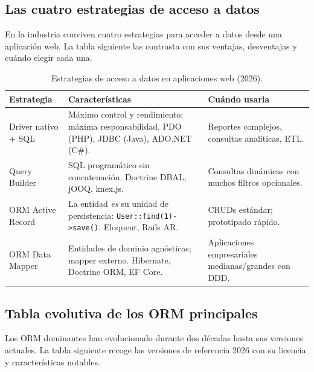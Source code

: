 \subsection{Las cuatro estrategias de acceso a datos}

En la industria conviven cuatro estrategias para acceder a
datos desde una aplicación web. La tabla siguiente las contrasta
con sus ventajas, desventajas y cuándo elegir cada una.


\begin{table}[htbp]
\centering
\caption{Estrategias de acceso a datos en aplicaciones web (2026).}
\footnotesize
\begin{tabularx}{\textwidth}{lXX}
\toprule
\textbf{Estrategia} & \textbf{Características} & \textbf{Cuándo usarla}\\
\midrule
Driver nativo + SQL & Máximo control y rendimiento; máxima responsabilidad. PDO (PHP), JDBC (Java), ADO.NET (C\#). & Reportes complejos, consultas analíticas, ETL.\\
Query Builder & SQL programático sin concatenación. Doctrine DBAL, jOOQ, knex.js. & Consultas dinámicas con muchos filtros opcionales.\\
ORM Active Record & La entidad \emph{es} su unidad de persistencia: \texttt{User::find(1)->save()}. Eloquent, Rails AR. & CRUDs estándar; prototipado rápido.\\
ORM Data Mapper & Entidades de dominio agnósticas; mapper externo. Hibernate, Doctrine ORM, EF Core. & Aplicaciones empresariales medianas/grandes con DDD.\\
\bottomrule
\end{tabularx}
\end{table}

\subsection{Tabla evolutiva de los ORM principales}

Los ORM dominantes han evolucionado durante dos décadas
hasta sus versiones actuales. La tabla siguiente recoge las
versiones de referencia 2026 con su licencia y características
notables.


